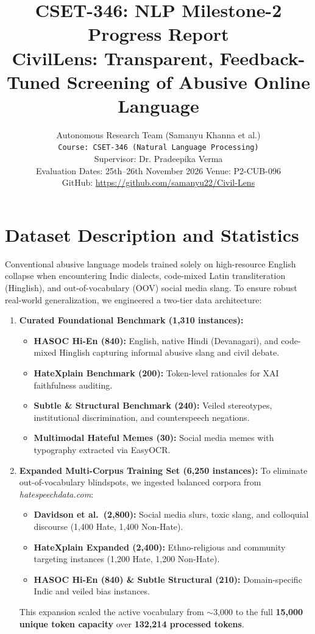 \documentclass[10pt,twocolumn]{article}
\title{\textbf{CSET-346: NLP Milestone-2 Progress Report \\ CivilLens: Transparent, Feedback-Tuned Screening of Abusive Online Language}}
\author{
  Autonomous Research Team (Samanyu Khanna et al.) \\
  \texttt{Course: CSET-346 (Natural Language Processing)} \\
  Supervisor: Dr. Pradeepika Verma \\
  Evaluation Dates: 25th--26th November 2026 \quad Venue: P2-CUB-096 \\
  GitHub: \url{https://github.com/samanyu22/Civil-Lens}
}
\date{}
\begin{document}
\maketitle

\section{Dataset Description and Statistics}
Conventional abusive language models trained solely on high-resource English collapse when encountering Indic dialects, code-mixed Latin transliteration (Hinglish), and out-of-vocabulary (OOV) social media slang. To ensure robust real-world generalization, we engineered a two-tier data architecture:
\begin{enumerate}
    \item \textbf{Curated Foundational Benchmark (1,310 instances):}
    \begin{itemize}
        \item \textbf{HASOC Hi-En (840):} English, native Hindi (Devanagari), and code-mixed Hinglish capturing informal abusive slang and civil debate.
        \item \textbf{HateXplain Benchmark (200):} Token-level rationales for XAI faithfulness auditing.
        \item \textbf{Subtle \& Structural Benchmark (240):} Veiled stereotypes, institutional discrimination, and counterspeech negations.
        \item \textbf{Multimodal Hateful Memes (30):} Social media memes with typography extracted via EasyOCR.
    \end{itemize}
    \item \textbf{Expanded Multi-Corpus Training Set (6,250 instances):}
    To eliminate out-of-vocabulary blindspots, we ingested balanced corpora from \textit{hatespeechdata.com}:
    \begin{itemize}
        \item \textbf{Davidson et al.\ (2,800):} Social media slurs, toxic slang, and colloquial discourse (1,400 Hate, 1,400 Non-Hate).
        \item \textbf{HateXplain Expanded (2,400):} Ethno-religious and community targeting instances (1,200 Hate, 1,200 Non-Hate).
        \item \textbf{HASOC Hi-En (840) \& Subtle Structural (210):} Domain-specific Indic and veiled bias instances.
    \end{itemize}
    This expansion scaled the active vocabulary from $\sim$3,000 to the full \textbf{15,000 unique token capacity} over \textbf{132,214 processed tokens}.
\end{enumerate}
\end{document}
